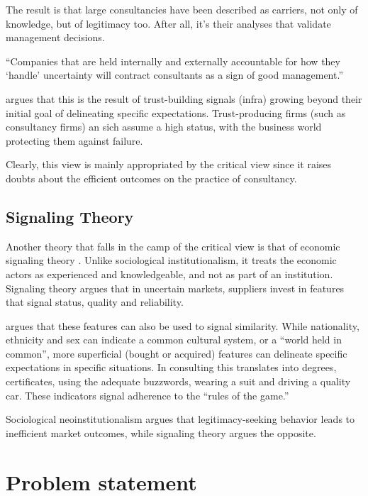 \documentclass[12pt]{article}
\begin{document}
The result is that large consultancies have been described as carriers,
not only of knowledge, but of legitimacy too. After all, it's their
analyses that validate management decisions.

``Companies that are held internally and externally accountable for how
they `handle' uncertainty will contract consultants as a sign of good
management.'' \citep[ 69]{kieser2006}

\citet[20-21]{zucker1985} argues that this is the result of
trust-building signals (infra) growing beyond their initial goal of
delineating specific expectations. Trust-producing firms (such as
consultancy firms) an sich assume a high status, with the business world
protecting them against failure.

Clearly, this view is mainly appropriated by the critical view since it
raises doubts about the efficient outcomes on the practice of
consultancy.

\hypertarget{signaling-theory}{%
\subsection{Signaling Theory}\label{signaling-theory}}

Another theory that falls in the camp of the critical view is that of
economic signaling theory \citep[ 8-10]{armbruster2006}. Unlike
sociological institutionalism, it treats the economic actors as
experienced and knowledgeable, and not as part of an institution.
Signaling theory argues that in uncertain markets, suppliers invest in
features that signal status, quality and reliability.

\citet[15-16]{zucker1985} argues that these features can also be used to
signal similarity. While nationality, ethnicity and sex can indicate a
common cultural system, or a ``world held in common'', more superficial
(bought or acquired) features can delineate specific expectations in
specific situations. In consulting this translates into degrees,
certificates, using the adequate buzzwords, wearing a suit and driving a
quality car. These indicators signal adherence to the ``rules of the
game.''

Sociological neoinstitutionalism argues that legitimacy-seeking behavior
leads to inefficient market outcomes, while signaling theory argues the
opposite.

\hypertarget{problem-statement}{%
\section{Problem statement}\label{problem-statement}}
\end{document}
